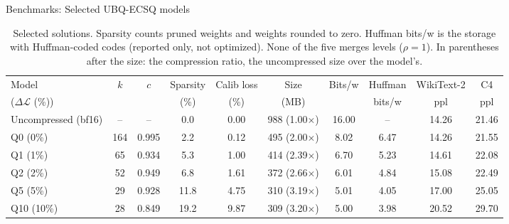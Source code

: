 \documentclass[aspectratio=169,10pt]{beamer}
\newcommand{\dloss}{\Delta\mathcal{L}}
\begin{document}
\begin{frame}{Benchmarks: Selected UBQ-ECSQ models}{}
\begin{table}
\centering
\begin{adjustbox}{width=\linewidth, totalheight=0.64\textheight, keepaspectratio, center}
\centering
\footnotesize
\setlength{\tabcolsep}{3.5pt}
\begin{tabular}{lccccccccc}
\toprule
Model & $k$ & $c$ & Sparsity & Calib loss & Size & Bits/w & Huffman & WikiText-2 & C4 \\
($\dloss$ (\%)) &     &     & (\%)     & (\%)        & (MB) &        & bits/w  & ppl        & ppl \\
\midrule
Uncompressed (bf16) & --  & --    & 0.0  & 0.00 & 988 (1.00$\times$) & 16.00 & --   & 14.26 & 21.46 \\
\addlinespace
Q0  (0\%)  & 164 & 0.995 & 2.2  & 0.12 & 495 (2.00$\times$) & 8.02 & 6.47 & 14.26 & 21.55 \\
Q1  (1\%)  & 65  & 0.934 & 5.3  & 1.00 & 414 (2.39$\times$) & 6.70 & 5.23 & 14.61 & 22.08 \\
Q2  (2\%)  & 52  & 0.949 & 6.8  & 1.61 & 372 (2.66$\times$) & 6.01 & 4.84 & 15.08 & 22.49 \\
Q5  (5\%)  & 29  & 0.928 & 11.8 & 4.75 & 310 (3.19$\times$) & 5.01 & 4.05 & 17.00 & 25.05 \\
Q10 (10\%) & 28  & 0.849 & 19.2 & 9.87 & 309 (3.20$\times$) & 5.00 & 3.98 & 20.52 & 29.70 \\
\bottomrule
\end{tabular}
\end{adjustbox}
\caption{Selected solutions. Sparsity counts pruned weights and weights rounded to zero. Huffman bits/w
is the storage with Huffman-coded codes (reported only, not optimized). None of the five merges levels
($\rho=1$). In parentheses after the size: the compression ratio, the uncompressed size over the model's.}\label{tab:models}
\end{table}
\end{frame}
\end{document}
